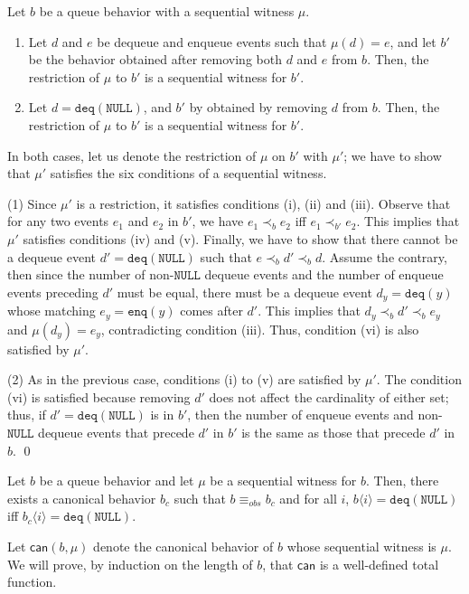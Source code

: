 \documentclass{LMCS}
\newcommand{\NULL}{\ensuremath{\mathtt{NULL}}}
\newcommand{\enq}{\ensuremath{\mathtt{enq}}}
\newcommand{\deq}{\ensuremath{\mathtt{deq}}}
\newcommand{\seqx}[2]{\ensuremath{#1\langle #2\rangle}}
\newcommand{\obsequiv}{\ensuremath{\equiv_{\mathit{obs}}}}
\newcommand\mylabel[1]{\label{#1}}
\begin{document}
\begin{lem}\mylabel{lem:seqwit-removals}
Let $b$ be a queue behavior with a sequential witness $\mu$.
\begin{enumerate}
\item Let $d$ and $e$ be dequeue and enqueue events such that $\mu(d)=e$, and 
let $b'$ be the behavior obtained after removing both $d$ and $e$ from $b$. 
Then, the restriction of $\mu$ to $b'$ is a sequential witness for $b'$.
\item Let $d=\deq(\NULL)$, and $b'$ by obtained by removing $d$ from $b$.
Then, the restriction of $\mu$ to $b'$ is a sequential witness for $b'$.
\end{enumerate}
\end{lem}
\proof
In both cases, let us denote the restriction of $\mu$ on $b'$ with $\mu'$; 
we have to show that $\mu'$ satisfies the six conditions of a sequential witness.

(1)
Since $\mu'$ is a restriction, it satisfies conditions (i), (ii) and (iii).
Observe that for any two events $e_1$ and $e_2$ in $b'$, we have $e_1\prec_b e_2$ iff $e_1\prec_{b'} e_2$.
This implies that $\mu'$ satisfies conditions (iv) and (v).
Finally, we have to show that there cannot be a dequeue event $d'=\deq(\NULL)$ such that $e\prec_b d'\prec_b d$.
Assume the contrary, then since the number of non-{\NULL} dequeue events and the number of enqueue events preceding $d'$ must be equal, there must be a dequeue event $d_y=\deq(y)$ whose matching $e_y=\enq(y)$ comes after $d'$.
This implies that $d_y\prec_b d' \prec_b e_y$ and $\mu(d_y)=e_y$, contradicting condition (iii).
Thus, condition (vi) is also satisfied by $\mu'$.

(2)
As in the previous case, conditions (i) to (v) are satisfied by $\mu'$.
The condition (vi) is satisfied because removing $d'$ does not affect the cardinality of either set; thus, if $d'=\deq(\NULL)$ is in $b'$, then the number of enqueue events and non-{\NULL} dequeue events that precede $d'$ in $b'$ is the same as those that precede $d'$ in $b$.
\qed

\begin{lem}\mylabel{lem:seqwit-canonical}
Let $b$ be a queue behavior and let $\mu$ be a sequential witness for $b$.
Then, there exists a canonical behavior $b_c$ such that $b\obsequiv b_c$ and for all $i$, $\seqx b i=\deq(\NULL)$ iff $\seqx {b_c} i=\deq(\NULL)$.
\end{lem}
\proof
Let $\mathsf{can}(b,\mu)$ denote the canonical behavior of $b$ whose sequential witness is $\mu$.
We will prove, by induction on the length of $b$, that $\mathsf{can}$ is a well-defined total function.
\end{document}
